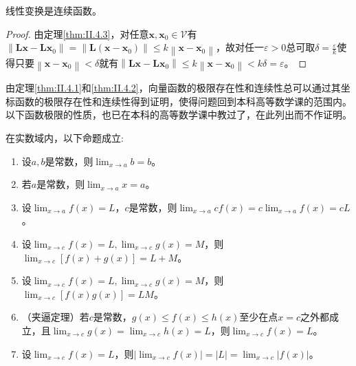 \documentclass[main.tex]{subfiles}
\begin{document}
\begin{corollary}
    线性变换是连续函数。
\end{corollary}
\begin{proof}
    由定理\ref{thm:II.4.3}，对任意$\mathbf{x},\mathbf{x}_0\in\mathcal{V}$有$\left\|\mathbf{Lx}-\mathbf{Lx}_0\right\|=\left\|\mathbf{L}\left(\mathbf{x}-\mathbf{x}_0\right)\right\|\leq k\left\|\mathbf{x}-\mathbf{x}_0\right\|$，故对任一$\varepsilon>0$总可取$\delta=\frac{\varepsilon}{k}$使得只要$\left\|\mathbf{x}-\mathbf{x}_0\right\|<\delta$就有$\left\|\mathbf{Lx}-\mathbf{Lx}_0\right\|\leq k\left\|\mathbf{x}-\mathbf{x}_0\right\|<k\delta=\varepsilon$。
\end{proof}

由定理\ref{thm:II.4.1}和\ref{thm:II.4.2}，向量函数的极限存在性和连续性总可以通过其坐标函数的极限存在性和连续性得到证明，使得问题回到本科高等数学课的范围内。以下函数极限的性质，也已在本科的高等数学课中教过了，在此列出而不作证明。
\begin{theorem}[函数极限的基本性质]\label{thm:II.4.4}
    在实数域内，以下命题成立:
    \begin{enumerate}
        \item 设$a,b$是常数，则$\lim_{x\to a}b=b$。
        \item 若$a$是常数，则$\lim_{x\to a} x=a$。
        \item 设$\lim_{x\to a}f\left(x\right)=L$，$c$是常数，则$\lim_{x\to a}cf\left(x\right)=c\lim_{x\to a}f\left(x\right)=cL$。
        \item 设$\lim_{x\to c}f\left(x\right)=L,\lim_{x\to c}g\left(x\right)=M$，则$\lim_{x\to c}\left[f\left(x\right)+g\left(x\right)\right]=L+M$。
        \item 设$\lim_{x\to c}f\left(x\right)=L,\lim_{x\to c}g\left(x\right)=M$，则$\lim_{x\to c}\left[f\left(x\right)g\left(x\right)\right]=LM$。
        \item （夹逼定理）若$c$是常数，$g\left(x\right)\leq f\left(x\right)\leq h\left(x\right)$至少在点$x=c$之外都成立，且$\lim_{x\to c}g\left(x\right)=\lim_{x\to c}h\left(x\right)=L$，则$\lim_{x\to c}f\left(x\right)=L$。
        \item 设$\lim_{x\to c}f\left(x\right)=L$，则$\left|\lim_{x\to c}f\left(x\right)\right|=\left|L\right|=\lim_{x\to c}\left|f\left(x\right)\right|$。
    \end{enumerate}
\end{theorem}
\end{document}
